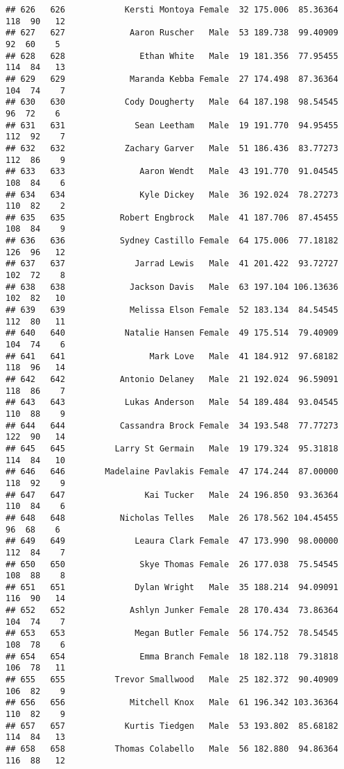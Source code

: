 \documentclass[
]{article}
\begin{document}
\begin{verbatim}
## 626   626            Kersti Montoya Female  32 175.006  85.36364 118  90   12
## 627   627             Aaron Ruscher   Male  53 189.738  99.40909  92  60    5
## 628   628               Ethan White   Male  19 181.356  77.95455 114  84   13
## 629   629             Maranda Kebba Female  27 174.498  87.36364 104  74    7
## 630   630            Cody Dougherty   Male  64 187.198  98.54545  96  72    6
## 631   631              Sean Leetham   Male  19 191.770  94.95455 112  92    7
## 632   632            Zachary Garver   Male  51 186.436  83.77273 112  86    9
## 633   633               Aaron Wendt   Male  43 191.770  91.04545 108  84    6
## 634   634               Kyle Dickey   Male  36 192.024  78.27273 110  82    2
## 635   635           Robert Engbrock   Male  41 187.706  87.45455 108  84    9
## 636   636           Sydney Castillo Female  64 175.006  77.18182 126  96   12
## 637   637              Jarrad Lewis   Male  41 201.422  93.72727 102  72    8
## 638   638             Jackson Davis   Male  63 197.104 106.13636 102  82   10
## 639   639             Melissa Elson Female  52 183.134  84.54545 112  80   11
## 640   640            Natalie Hansen Female  49 175.514  79.40909 104  74    6
## 641   641                 Mark Love   Male  41 184.912  97.68182 118  96   14
## 642   642           Antonio Delaney   Male  21 192.024  96.59091 118  86    7
## 643   643            Lukas Anderson   Male  54 189.484  93.04545 110  88    9
## 644   644           Cassandra Brock Female  34 193.548  77.77273 122  90   14
## 645   645          Larry St Germain   Male  19 179.324  95.31818 114  84   10
## 646   646        Madelaine Pavlakis Female  47 174.244  87.00000 118  92    9
## 647   647                Kai Tucker   Male  24 196.850  93.36364 110  84    6
## 648   648           Nicholas Telles   Male  26 178.562 104.45455  96  68    6
## 649   649              Leaura Clark Female  47 173.990  98.00000 112  84    7
## 650   650               Skye Thomas Female  26 177.038  75.54545 108  88    8
## 651   651              Dylan Wright   Male  35 188.214  94.09091 116  90   14
## 652   652             Ashlyn Junker Female  28 170.434  73.86364 104  74    7
## 653   653              Megan Butler Female  56 174.752  78.54545 108  78    6
## 654   654               Emma Branch Female  18 182.118  79.31818 106  78   11
## 655   655          Trevor Smallwood   Male  25 182.372  90.40909 106  82    9
## 656   656             Mitchell Knox   Male  61 196.342 103.36364 110  82    9
## 657   657            Kurtis Tiedgen   Male  53 193.802  85.68182 114  84   13
## 658   658          Thomas Colabello   Male  56 182.880  94.86364 116  88   12

\end{verbatim}
\end{document}
